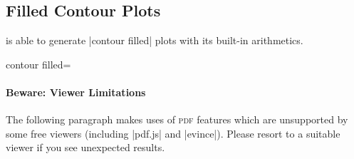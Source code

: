 {{%
%
%
%

}


\subsection{Filled Contour Plots}
\label{sec:pgfplots:filled:contour}

{
\PGFPlots{} is able to generate |contour filled| plots with its built-in
arithmetics.

\begin{plottype}[/pgfplots]{
    contour filled=\textcolor{black}{}%
}
    \paragraph{Beware: Viewer Limitations}

    The following paragraph makes uses of \textsc{pdf} features which are
    unsupported by some free viewers (including |pdf.js| and |evince|). Please
    resort to a suitable viewer if you see unexpected results.


\end{plottype}}}
